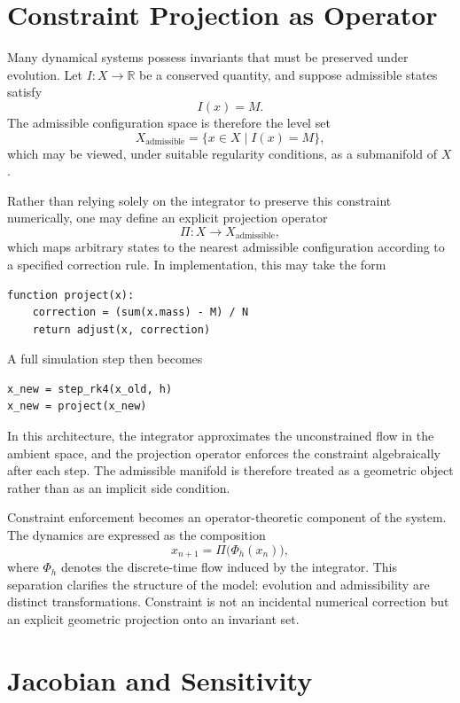 \documentclass[12pt]{book}
\begin{document}
\section{Constraint Projection as Operator}

Many dynamical systems possess invariants that must be preserved under
evolution. Let $I : X \to \mathbb{R}$ be a conserved quantity, and
suppose admissible states satisfy
\[
I(x) = M.
\]
The admissible configuration space is therefore the level set
\[
X_{\text{admissible}} = \{ x \in X \mid I(x) = M \},
\]
which may be viewed, under suitable regularity conditions, as a
submanifold of $X$.

Rather than relying solely on the integrator to preserve this
constraint numerically, one may define an explicit projection operator
\[
\Pi : X \to X_{\text{admissible}},
\]
which maps arbitrary states to the nearest admissible configuration
according to a specified correction rule. In implementation, this may
take the form

\begin{verbatim}
function project(x):
    correction = (sum(x.mass) - M) / N
    return adjust(x, correction)
\end{verbatim}

A full simulation step then becomes

\begin{verbatim}
x_new = step_rk4(x_old, h)
x_new = project(x_new)
\end{verbatim}

In this architecture, the integrator approximates the unconstrained
flow in the ambient space, and the projection operator enforces the
constraint algebraically after each step. The admissible manifold is
therefore treated as a geometric object rather than as an implicit
side condition.

Constraint enforcement becomes an operator-theoretic component of the
system. The dynamics are expressed as the composition
\[
x_{n+1} = \Pi\!\big(\Phi_h(x_n)\big),
\]
where $\Phi_h$ denotes the discrete-time flow induced by the
integrator. This separation clarifies the structure of the model:
evolution and admissibility are distinct transformations. Constraint
is not an incidental numerical correction but an explicit geometric
projection onto an invariant set.

\section{Jacobian and Sensitivity}
\end{document}
